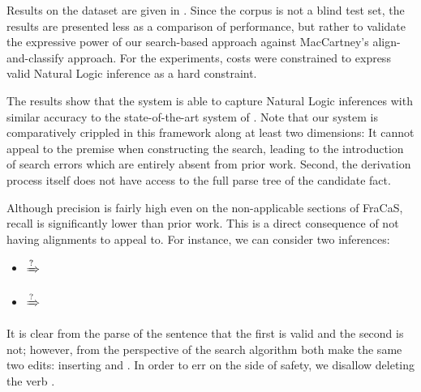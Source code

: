 Results on the dataset are given in .
Since the corpus is not a blind test set, the results are presented
  less as a comparison of performance, but rather to validate
  the expressive power of our search-based approach against
  MacCartney's align-and-classify approach.
For the experiments, costs were constrained to express valid
  Natural Logic inference as a hard constraint.

The results show that the system is able to capture Natural Logic
  inferences with similar accuracy to the state-of-the-art system of
  .
Note that our system is comparatively crippled in this framework
  along at least two dimensions:
It cannot appeal to the premise when constructing the search,
  leading to the introduction of search errors which are entirely
  absent from prior work.
Second, the derivation process itself does not have access to the
  full parse tree of the candidate fact.

Although precision is fairly high even on the non-applicable
  sections of FraCaS, recall is significantly lower than prior work.
This is a direct consequence of not having alignments to appeal to.
For instance, we can consider two inferences:

\vspace{-0.25em}
\begin{itemize}
\setlength{\itemsep}{-0.5em}
\item[]  $\xRightarrow{?}$ 
\item[]  $\xRightarrow{?}$ 
\end{itemize}
\vspace{-0.25em}

It is clear from the parse of the sentence that the first is valid
  and the second is not; however, from the perspective of the search
  algorithm both make the same two edits: inserting  and .
In order to err on the side of safety, we disallow deleting the verb
  .


